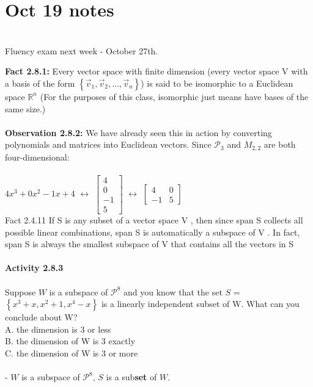 \documentclass{article}
\begin{document}
\section*{Oct 19 notes}\\
Fluency exam next week - October 27th.

\noindent \textbf{Fact 2.8.1:} Every vector space with finite dimension (every vector space V with a basis of the form $\left\{ \vec{v}_{1}, \vec{v}_{2}, \ldots, \vec{v}_{n} \right\}$) is said to be isomorphic to a Euclidean space $\mathbb{R}^{n}$ (For the purposes of this class, isomorphic just means have bases of the same size.)\\
\\
\noindent \textbf{Observation 2.8.2:} We have already seen this in action by converting polynomials and matrices into Euclidean vectors. Since $\mathcal{P}_{3}$ and $M_{2,2}$ are both four-dimensional:\\
\\
$4x^{3} + 0x^{2} - 1x + 4$ 
$\leftrightarrow$ 
$\left[\begin{matrix} 4\\0\\-1\\5 \end{matrix}\right]$ 
$\leftrightarrow$ 
$\left[\begin{matrix} 4&0\\-1&5 \end{matrix}\right]$
\\
Fact 2.4.11 If S is any subset of a vector space V , then since span S collects
all possible linear combinations, span S is automatically a subspace of V .
In fact, span S is always the smallest subspace of V that contains all the
vectors in S\\
\\
\noindent \textbf{Activity 2.8.3} \\
\\
Suppose $W$ is a subspace of $\mathcal{P}^{8}$ and you know that the set $S$ = $\left\{ x^{3} + x, x^{2} + 1, x^{4} -x  \right\}$ is a linearly independent subset of W. What can you conclude about W?\\
A. the dimension is 3 or less\\
B. the dimension of W is 3 exactly\\
C. the dimension of W is 3 or more\\
\\
- $W$ is a subspace of $\mathcal{P}^{8}$, $S$ is a sub\textbf{set} of $W$.\\
\end{document}
